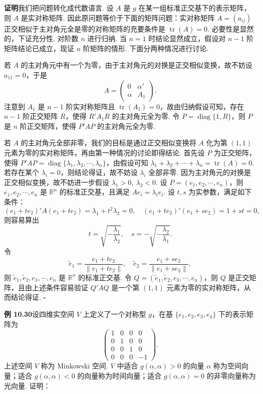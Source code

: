 \documentclass[UTF8, 12pt, fontset=fandol, oneside]{ctexart}
\begin{document}
\noindent\textbf{证明}\quad 我们把问题转化成代数语言. 设 $A$ 是 $g$ 在某一组标准正交基下的表示矩阵，则 $A$ 是实对称矩阵. 因此原问题等价于下面的矩阵问题：实对称矩阵 $A=(a_{ij})$ 正交相似于主对角元全是零的对称矩阵的充要条件是 $\operatorname{tr}(A)=0$. 必要性是显然的，下证充分性. 对阶数 $n$ 进行归纳. 当 $n=1$ 时结论显然成立，假设对 $n-1$ 阶矩阵结论已成立，现证 $n$ 阶矩阵的情形. 下面分两种情况进行讨论.

若 $A$ 的主对角元中有一个为零，由于主对角元的对换是正交相似变换，故不妨设 $a_{11}=0$，于是
\[
A=\left(\begin{array}{cc}
0 & \alpha'\\
\alpha & A_1
\end{array}\right).
\]
注意到 $A_1$ 是 $n-1$ 阶实对称矩阵且 $\operatorname{tr}(A_1)=0$，故由归纳假设可知，存在 $n-1$ 阶正交矩阵 $R$，使得 $R'A_1R$ 的主对角元全为零. 令 $P=\operatorname{diag}\{1,R\}$，则 $P$ 是 $n$ 阶正交矩阵，使得 $P'AP$ 的主对角元全为零.

若 $A$ 的主对角元全部非零，我们的目标是通过正交相似变换将 $A$ 化为第 $(1,1)$ 元素为零的实对称矩阵，再由第一种情况的讨论即得结论. 首先设 $P$ 为正交矩阵，使得 $P'AP=\operatorname{diag}\{\lambda_1,\lambda_2,\cdots,\lambda_n\}$，由假设可知 $\lambda_1+\lambda_2+\cdots+\lambda_n=\operatorname{tr}(A)=0$. 若存在某个 $\lambda_i=0$，则结论得证，故不妨设 $\lambda_i$ 全部非零. 因为主对角元的对换是正交相似变换，故不妨进一步假设 $\lambda_1>0,\ \lambda_2<0$. 设 $P=(e_1,e_2,\cdots,e_n)$，则 $e_1,e_2,\cdots,e_n$ 是 $\mathbb{R}^n$ 的标准正交基，且满足 $Ae_i=\lambda_i e_i$. 设 $t,s$ 为实参数，满足如下条件：
\[
(e_1+te_2)'A(e_1+te_2)=\lambda_1+t^2\lambda_2=0,\quad
(e_1+te_2)'(e_1+se_2)=1+st=0,
\]
则容易算出
\[
t=\sqrt{-\frac{\lambda_1}{\lambda_2}},\quad
s=-\sqrt{-\frac{\lambda_2}{\lambda_1}}.
\]
令
\[
\widetilde e_1=\frac{e_1+te_2}{\|e_1+te_2\|},\quad
\widetilde e_2=\frac{e_1+se_2}{\|e_1+se_2\|},
\]
则 $\widetilde e_1,\widetilde e_2,e_3,\cdots,e_n$ 是 $\mathbb{R}^n$ 的标准正交基. 令 $Q=(\widetilde e_1,\widetilde e_2,e_3,\cdots,e_n)$，则 $Q$ 是正交矩阵，且由上述条件容易验证 $Q'AQ$ 是一个第 $(1,1)$ 元素为零的实对称矩阵，从而结论得证. $\square$

\noindent\textbf{例 10.30}\quad 设四维实空间 $V$ 上定义了一个对称型 $g$，在基 $\{e_1,e_2,e_3,e_4\}$ 下的表示矩阵为
\[
\left(\begin{array}{rrrr}
1 & 0 & 0 & 0\\
0 & 1 & 0 & 0\\
0 & 0 & 1 & 0\\
0 & 0 & 0 & -1
\end{array}\right).
\]
上述空间 $V$ 称为 Minkowski 空间. $V$ 中适合 $g(\alpha,\alpha)>0$ 的向量 $\alpha$ 称为空间向量；适合 $g(\alpha,\alpha)<0$ 的向量称为时间向量；适合 $g(\alpha,\alpha)=0$ 的非零向量称为光向量. 证明：
\end{document}
